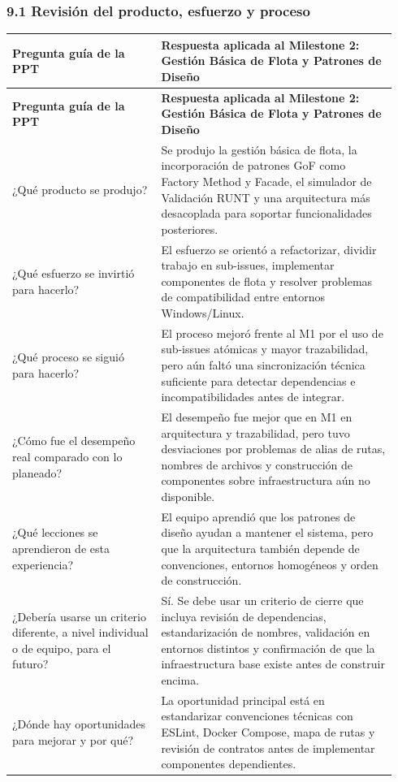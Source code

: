 \documentclass[11pt,a4paper]{article}
\begin{document}
\subsubsection{9.1 Revisión del producto, esfuerzo y proceso}

\begingroup
\small
\setlength{\tabcolsep}{3pt}
\begin{longtable}{P{0.36\linewidth}P{0.58\linewidth}}
\toprule
\textbf{Pregunta guía de la PPT} & \textbf{Respuesta aplicada al Milestone 2: Gestión Básica de Flota y Patrones de Diseño} \\
\midrule
\endfirsthead
\toprule
\textbf{Pregunta guía de la PPT} & \textbf{Respuesta aplicada al Milestone 2: Gestión Básica de Flota y Patrones de Diseño} \\
\midrule
\endhead
\bottomrule
\endlastfoot
¿Qué producto se produjo? & Se produjo la gestión básica de flota, la incorporación de patrones GoF como Factory Method y Facade, el simulador de Validación RUNT y una arquitectura más desacoplada para soportar funcionalidades posteriores. \\
¿Qué esfuerzo se invirtió para hacerlo? & El esfuerzo se orientó a refactorizar, dividir trabajo en sub-issues, implementar componentes de flota y resolver problemas de compatibilidad entre entornos Windows/Linux. \\
¿Qué proceso se siguió para hacerlo? & El proceso mejoró frente al M1 por el uso de sub-issues atómicas y mayor trazabilidad, pero aún faltó una sincronización técnica suficiente para detectar dependencias e incompatibilidades antes de integrar. \\
¿Cómo fue el desempeño real comparado con lo planeado? & El desempeño fue mejor que en M1 en arquitectura y trazabilidad, pero tuvo desviaciones por problemas de alias de rutas, nombres de archivos y construcción de componentes sobre infraestructura aún no disponible. \\
¿Qué lecciones se aprendieron de esta experiencia? & El equipo aprendió que los patrones de diseño ayudan a mantener el sistema, pero que la arquitectura también depende de convenciones, entornos homogéneos y orden de construcción. \\
¿Debería usarse un criterio diferente, a nivel individual o de equipo, para el futuro? & Sí. Se debe usar un criterio de cierre que incluya revisión de dependencias, estandarización de nombres, validación en entornos distintos y confirmación de que la infraestructura base existe antes de construir encima. \\
¿Dónde hay oportunidades para mejorar y por qué? & La oportunidad principal está en estandarizar convenciones técnicas con ESLint, Docker Compose, mapa de rutas y revisión de contratos antes de implementar componentes dependientes. \\

\end{longtable}
\end{document}
